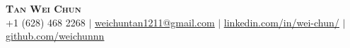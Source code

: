 \begin{center}
    \textbf{\Huge \scshape Tan Wei Chun} \\ \vspace{5pt}
    \small +1 (628) 468 2268 $|$ 
    \href{mailto:weichuntan1211@gmail.com}{\underline{weichuntan1211@gmail.com}} $|$ 
    \href{https://www.linkedin.com/in/wei-chun/}{\underline{linkedin.com/in/wei-chun/}} $|$
    \href{https://github.com/weichunnn}{\underline{github.com/weichunnn}}
\end{center}